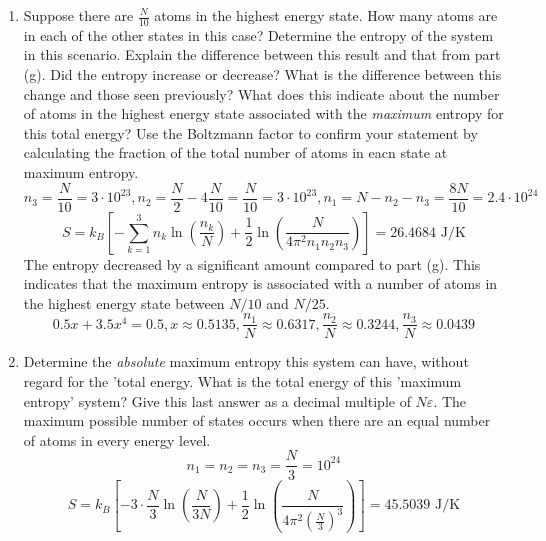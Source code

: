 \documentclass{article}
\begin{document}
\begin{enumerate}
\begin{enumerate}
            \\\[n_3 = \frac{N}{25} = \boxed{1.2 \cdot 10^{23}}, n_2 = \frac{N}{2} - 4\frac{N}{25} = \frac{39N}{100} = \boxed{1.02 \cdot 10^{24}}, n_1 = N - n_2 - n_3 = \frac{62N}{100} = \boxed{1.86 \cdot 10^{24}}\]
            \[S = k_B \left[-\sum_{k=1}^{3} n_k \ln(\frac{n_k}{N}) + \frac 1 2 \ln(\frac{N}{4\pi^2n_1n_2n_3})\right] = \boxed{32.8014 \text{ J/K}}\]
            The entropy increased compared to part (f) because there are more possible states the atoms can be in.
            \item Suppose there are $\frac N {10}$ atoms in the highest energy state. How many atoms are in each of the other states in this case? Determine the entropy of the system in this scenario. Explain the difference between this result and that from part (g). Did the entropy increase or decrease? What is the difference between this change and those seen previously? What does this indicate about the number of atoms in the highest energy state associated with the \textit{maximum} entropy for this total energy? Use the Boltzmann factor to confirm your statement by calculating the fraction of the total number of atoms in eacn state at maximum entropy.
            \\\[n_3 = \frac{N}{10} = \boxed{3 \cdot 10^{23}}, n_2 = \frac{N}{2} - 4\frac{N}{10} = \frac{N}{10}= \boxed{3 \cdot 10^{23}}, n_1 = N - n_2 - n_3 = \frac{8N}{10} = \boxed{2.4 \cdot 10^{24}}\]
            \[S = k_B \left[-\sum_{k=1}^{3} n_k \ln(\frac{n_k}{N}) + \frac 1 2 \ln(\frac{N}{4\pi^2n_1n_2n_3})\right] = \boxed{26.4684 \text{ J/K}}\]
            The entropy decreased by a significant amount compared to part (g). This indicates that the maximum entropy is associated with a number of atoms in the highest energy state between $N/10$ and $N/25$.
            \[0.5x + 3.5x^4 = 0.5, x \approx 0.5135, \frac{n_1}{N} \approx \boxed{0.6317}, \frac{n_2}{N} \approx \boxed{0.3244}, \frac{n_3}{N} \approx \boxed{0.0439}\]
            \item Determine the \textit{absolute} maximum entropy this system can have, without regard for the 'total energy. What is the total energy of this 'maximum entropy' system? Give this last answer as a decimal multiple of $N\varepsilon$.
            The maximum possible number of states occurs when there are an equal number of atoms in every energy level.
            \[n_1 = n_2 = n_3 = \frac{N}{3} = 10^{24}\]
            \[S = k_B \left[-3 \cdot \frac{N}{3} \ln(\frac{N}{3N}) + \frac 1 2 \ln(\frac{N}{4\pi^2 (\frac{N}{3})^3})\right] = \boxed{45.5039 \text{ J/K}}\]

\end{enumerate}
\end{enumerate}
\end{document}
